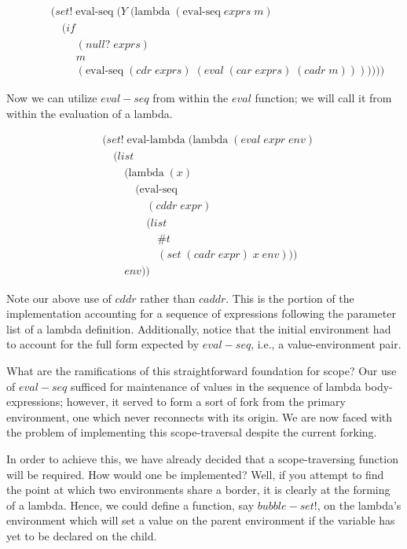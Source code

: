 \begin{figure}[ht]
\caption{}\label{scheme}
\begin{align*}
& (set! \; \text{eval-seq} \; (Y \; (\text{lambda} \; (\text{eval-seq} \; exprs \; m)
\\& \quad (if
\\& \qquad \; (null? \; exprs)
\\& \qquad \; m
\\& \qquad \; (\text{eval-seq} \; (cdr \; exprs) \; (eval \; (car \; exprs) \; (cadr \; m)))))))
\end{align*}
\end{figure}

Now we can utilize $eval-seq$ from within the $eval$ function; we will call
it from within the evaluation of a lambda.

\begin{figure}[ht]
\caption{}\label{scheme}
\begin{align*}
& (set! \; \text{eval-lambda} \; (\text{lambda} \; (eval \; expr \; env)
\\& \quad (list
\\& \qquad (\text{lambda} \; (x) \; 
\\& \qquad \quad (\text{eval-seq} \; 
\\& \qquad \qquad (cddr \; expr) \; 
\\& \qquad \qquad (list
\\& \qquad \qquad \quad \#t
\\& \qquad \qquad \quad (set \; (cadr \; expr) \; x \; env)))
\\& \qquad env))
\end{align*}
\end{figure}

Note our above use of $cddr$ rather than $caddr$. This is the portion of the
implementation accounting for a sequence of expressions following the
parameter list of a lambda definition. Additionally, notice that the initial
environment had to account for the full form expected by $eval-seq$, i.e.,
a value-environment pair.

What are the ramifications of this straightforward foundation for scope? Our
use of $eval-seq$ sufficed for maintenance of values in the sequence of 
lambda body-expressions; however, it served to form a sort of fork from the
primary environment, one which never reconnects with its origin. We are now
faced with the problem of implementing this scope-traversal despite the
current forking.

In order to achieve this, we have already decided that a scope-traversing
function will be required. How would one be implemented? Well, if you attempt
to find the point at which two environments share a border, it is clearly at
the forming of a lambda. Hence, we could define a function, say 
$bubble-set!$, on the lambda's environment which will set a value on the
parent environment if the variable has yet to be declared on the child.

